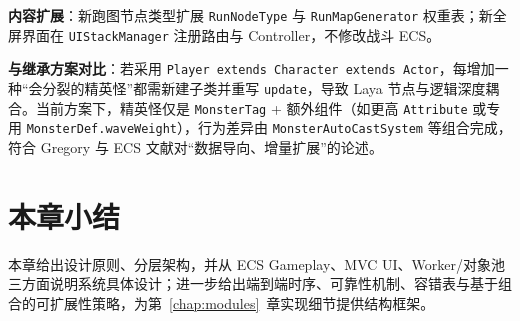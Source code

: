 \textbf{内容扩展}：新跑图节点类型扩展 \texttt{RunNodeType} 与 \texttt{RunMapGenerator} 权重表；新全屏界面在 \texttt{UIStackManager} 注册路由与 Controller，不修改战斗 ECS。

\textbf{与继承方案对比}：若采用 \texttt{Player extends Character extends Actor}，每增加一种“会分裂的精英怪”都需新建子类并重写 \texttt{update}，导致 Laya 节点与逻辑深度耦合。当前方案下，精英怪仅是 \texttt{MonsterTag} + 额外组件（如更高 \texttt{Attribute} 或专用 \texttt{MonsterDef.waveWeight}），行为差异由 \texttt{MonsterAutoCastSystem} 等组合完成，符合 Gregory 与 ECS 文献对“数据导向、增量扩展”的论述\cite{gregory2018game}。

\section{本章小结}

本章给出设计原则、分层架构，并从 ECS Gameplay、MVC UI、Worker/对象池三方面说明系统具体设计；进一步给出端到端时序、可靠性机制、容错表与基于组合的可扩展性策略，为第~\ref{chap:modules}~章实现细节提供结构框架。
